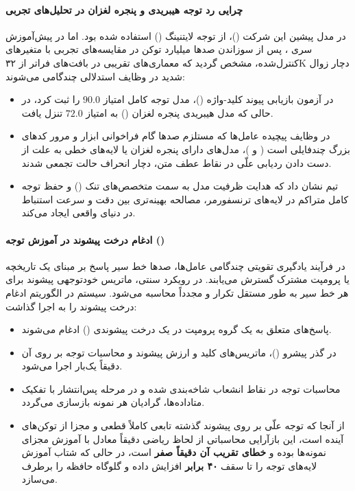\paragraph*{چرایی رد توجه هیبریدی و پنجره لغزان در تحلیل‌های تجربی }
در مدل پیشین این شرکت ()، از توجه لایتنینگ () استفاده شده بود. اما در پیش‌آموزش سری ، پس از سوزاندن صدها میلیارد توکن در مقایسه‌های تجربی با متغیرهای کنترل‌شده، مشخص گردید که معماری‌های تقریبی در بافت‌های فراتر از ۳۲K دچار زوال شدید در وظایف استدلالی چندگامی می‌شوند:
\begin{itemize}
    \item در آزمون بازیابی پیوند کلید-واژه ()، مدل توجه کامل امتیاز $90.0$ را ثبت کرد، در حالی که مدل هیبریدی پنجره لغزان () به امتیاز $72.0$ تنزل یافت.
    \item در وظایف پیچیده عامل‌ها که مستلزم صدها گام فراخوانی ابزار و مرور کدهای بزرگ چندفایلی است ( و )، مدل‌های دارای پنجره لغزان یا لایه‌های خطی به علت از دست دادن ردیابی علّی در نقاط عطف متن، دچار انحراف حالت تجمعی شدند.
    \item تیم  نشان داد که هدایت ظرفیت مدل به سمت متخصص‌های تنک () و حفظ توجه کامل متراکم در لایه‌های ترنسفورمر، مصالحه بهینه‌تری بین دقت و سرعت استنباط در دنیای واقعی ایجاد می‌کند.
\end{itemize}

\paragraph*{ادغام درخت پیشوند در آموزش توجه ()}
در فرآیند یادگیری تقویتی چندگامی عامل‌ها، صدها خط سیر پاسخ بر مبنای یک تاریخچه یا پرومپت مشترک گسترش می‌یابند. در رویکرد سنتی، ماتریس خود‌توجهی پیشوند برای هر خط سیر به طور مستقل تکرار و مجدداً محاسبه می‌شود. سیستم  در  الگوریتم ادغام درخت پیشوند را به اجرا گذاشت:
\begin{itemize}
    \item پاسخ‌های متعلق به یک گروه پرومپت در یک درخت پیشوندی () ادغام می‌شوند.
    \item در گذر پیشرو ()، ماتریس‌های کلید و ارزش پیشوند و محاسبات توجه بر روی آن دقیقاً یک‌بار اجرا می‌شود.
    \item محاسبات توجه در نقاط انشعاب شاخه‌بندی شده و در مرحله پس‌انتشار با تفکیک متاداده‌ها، گرادیان هر نمونه بازسازی می‌گردد.
    \item از آنجا که توجه علّی بر روی پیشوند گذشته تابعی کاملاً قطعی و مجزا از توکن‌های آینده است، این بازآرایی محاسباتی از لحاظ ریاضی دقیقاً معادل با آموزش مجزای نمونه‌ها بوده و \textbf{خطای تقریب آن دقیقاً صفر} است، در حالی که شتاب آموزش لایه‌های توجه را تا سقف \textbf{۴۰ برابر} افزایش داده و گلوگاه حافظه را برطرف می‌سازد.
\end{itemize}

